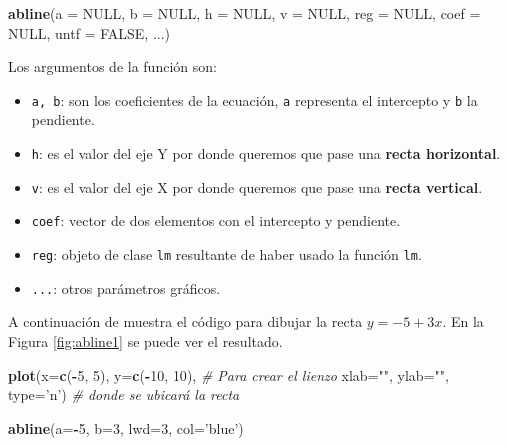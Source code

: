 \documentclass[10pt,]{krantz}
\makeatletter
\newenvironment{Shaded}{\begin{snugshade}}{\end{snugshade}}
\newcommand{\KeywordTok}[1]{\textcolor[rgb]{0.13,0.29,0.53}{\textbf{#1}}}
\newcommand{\DataTypeTok}[1]{\textcolor[rgb]{0.13,0.29,0.53}{#1}}
\newcommand{\DecValTok}[1]{\textcolor[rgb]{0.00,0.00,0.81}{#1}}
\newcommand{\StringTok}[1]{\textcolor[rgb]{0.31,0.60,0.02}{#1}}
\newcommand{\CommentTok}[1]{\textcolor[rgb]{0.56,0.35,0.01}{\textit{#1}}}
\newcommand{\OtherTok}[1]{\textcolor[rgb]{0.56,0.35,0.01}{#1}}
\newcommand{\OperatorTok}[1]{\textcolor[rgb]{0.81,0.36,0.00}{\textbf{#1}}}
\newcommand{\NormalTok}[1]{#1}
\providecommand{\tightlist}{%
  \setlength{\itemsep}{0pt}\setlength{\parskip}{0pt}}
\newenvironment{kframe}{%
\medskip{}
\setlength{\fboxsep}{.8em}
 \def\at@end@of@kframe{}%
 \ifinner\ifhmode%
  \def\at@end@of@kframe{\end{minipage}}%
  \begin{minipage}{\columnwidth}%
 \fi\fi%
 \def\FrameCommand##1{\hskip\@totalleftmargin \hskip-\fboxsep
 \colorbox{shadecolor}{##1}\hskip-\fboxsep
     \hskip-\linewidth \hskip-\@totalleftmargin \hskip\columnwidth}%
 \MakeFramed {\advance\hsize-\width
   \@totalleftmargin\z@ \linewidth\hsize
   \@setminipage}}%
 {\par\unskip\endMakeFramed%
 \at@end@of@kframe}
\renewenvironment{Shaded}{\begin{kframe}}{\end{kframe}}
\makeatother
\begin{document}
\begin{Shaded}
\begin{Highlighting}[]
\KeywordTok{abline}\NormalTok{(}\DataTypeTok{a =} \OtherTok{NULL}\NormalTok{, }\DataTypeTok{b =} \OtherTok{NULL}\NormalTok{, }\DataTypeTok{h =} \OtherTok{NULL}\NormalTok{, }\DataTypeTok{v =} \OtherTok{NULL}\NormalTok{, }\DataTypeTok{reg =} \OtherTok{NULL}\NormalTok{,}
       \DataTypeTok{coef =} \OtherTok{NULL}\NormalTok{, }\DataTypeTok{untf =} \OtherTok{FALSE}\NormalTok{, ...)}
\end{Highlighting}
\end{Shaded}

Los argumentos de la función son:

\begin{itemize}
\tightlist
\item
  \texttt{a,\ b}: son los coeficientes de la ecuación, \texttt{a}
  representa el intercepto y \texttt{b} la pendiente.
\item
  \texttt{h}: es el valor del eje Y por donde queremos que pase una
  \textbf{recta horizontal}.
\item
  \texttt{v}: es el valor del eje X por donde queremos que pase una
  \textbf{recta vertical}.
\item
  \texttt{coef}: vector de dos elementos con el intercepto y pendiente.
\item
  \texttt{reg}: objeto de clase \texttt{lm} resultante de haber usado la
  función \texttt{lm}.
\item
  \texttt{...}: otros parámetros gráficos.
\end{itemize}

A continuación de muestra el código para dibujar la recta \(y=-5+3x\).
En la Figura \ref{fig:abline1} se puede ver el resultado.

\begin{Shaded}
\begin{Highlighting}[]
\KeywordTok{plot}\NormalTok{(}\DataTypeTok{x=}\KeywordTok{c}\NormalTok{(}\OperatorTok{-}\DecValTok{5}\NormalTok{, }\DecValTok{5}\NormalTok{), }\DataTypeTok{y=}\KeywordTok{c}\NormalTok{(}\OperatorTok{-}\DecValTok{10}\NormalTok{, }\DecValTok{10}\NormalTok{),    }\CommentTok{# Para crear el lienzo}
     \DataTypeTok{xlab=}\StringTok{""}\NormalTok{, }\DataTypeTok{ylab=}\StringTok{""}\NormalTok{, }\DataTypeTok{type=}\StringTok{'n'}\NormalTok{)  }\CommentTok{# donde se ubicará la recta}

\KeywordTok{abline}\NormalTok{(}\DataTypeTok{a=}\OperatorTok{-}\DecValTok{5}\NormalTok{, }\DataTypeTok{b=}\DecValTok{3}\NormalTok{, }\DataTypeTok{lwd=}\DecValTok{3}\NormalTok{, }\DataTypeTok{col=}\StringTok{'blue'}\NormalTok{)}
\end{Highlighting}
\end{Shaded}
\end{document}

